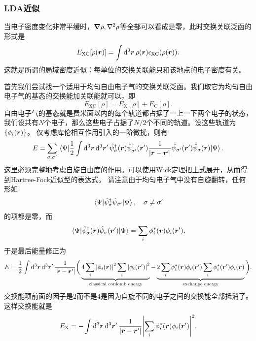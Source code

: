 \documentclass[hyperref, UTF8, a4paper]{ctexart}
\begin{document}
\subsubsection{LDA近似}

当电子密度变化非常平缓时，$\grad{\rho},\laplacian{\rho}$等全部可以看成是零，此时交换关联泛函的形式是
\begin{equation}
    E_\text{XC}[\rho(\vb*{r})] = \int \dd[3]{\vb*{r}} \rho(\vb*{r}) \epsilon_\text{XC}(\rho(\vb*{r})).
\end{equation}
这就是所谓的局域密度近似：每单位的交换关联能只和该地点的电子密度有关。

首先我们尝试找一个适用于均匀自由电子气的交换关联泛函。我们取它为均匀自由电子气的基态的交换能加关联能就可以，即
\begin{equation}
    E_\text{XC}[\rho] = E_\text{X}[\rho] + E_\text{C}[\rho].
\end{equation}
自由电子气的基态就是费米面以内的每个轨道都占据了一上一下两个电子的状态，我们设共有$N$个电子，那么这些电子占据了$N/2$个不同的轨道。设这些轨道为$\{\phi_i(\vb*{r})\}$。
仅考虑库伦相互作用引入的一阶微扰，则有
\[
    E = \sum_{\sigma, \sigma'} \mel{\Psi}{
        \frac{1}{2} \int \dd[3]{\vb*{r}} \dd[3]{\vb*{r}'} \hat{\psi}^\dagger_{\sigma}(\vb*{r}) \hat{\psi}^\dagger_{\sigma'}(\vb*{r}') \frac{1}{\abs{\vb*{r} - \vb*{r}'}} \hat{\psi}_{\sigma'}(\vb*{r}') \hat{\psi}_\sigma(\vb*{r})
    }{\Psi}.
\]
这里必须完整地考虑自旋自由度的作用。可以使用Wick定理把上式展开，从而得到Hartree-Fock近似型的表达式。
请注意由于均匀电子气中没有自旋翻转，任何形如
\[
    \mel{\Psi}{\hat{\psi}_\sigma^\dagger \hat{\psi}_{\sigma'}}{\Psi}, \quad \sigma \neq \sigma'
\]
的项都是零，而
\[
    \mel{\Psi}{\hat{\psi}^\dagger_\sigma(\vb*{r}) \hat{\psi}_{\sigma}(\vb*{r}')}{\Psi} = \sum_i \phi_i^*(\vb*{r}) \phi_i(\vb*{r}'),
\]
于是最后能量修正为
\[
    E = \frac{1}{2} \int \dd[3]{\vb*{r}} \dd[3]{\vb*{r}'} \frac{1}{\abs{\vb*{r} - \vb*{r}'}} \bigg(
        \underbrace{4 \sum_{i} \abs{\phi_i(\vb*{r})}^2 \sum_{i} \abs{\phi_i(\vb*{r}')}^2}_\text{classical coulomb energy} - \underbrace{2 \sum_i \phi_i^*(\vb*{r}) \phi_i(\vb*{r}') \sum_i \phi_i^*(\vb*{r}') \phi_i(\vb*{r})}_\text{exchange energy}
    \bigg).
\]
交换能项前面的因子是$2$而不是$4$是因为自旋不同的电子之间的交换能全部抵消了。这样交换能就是
\begin{equation}
    E_\text{X} = - \int \dd[3]{\vb*{r}} \dd[3]{\vb*{r}'} \frac{1}{\abs{\vb*{r} - \vb*{r}'}} \abs{\sum_i \phi_i^*(\vb*{r}) \phi_i(\vb*{r}')}^2 . 
    \label{eq:exchange-energy-homogeneous-gas}
\end{equation}
\end{document}
